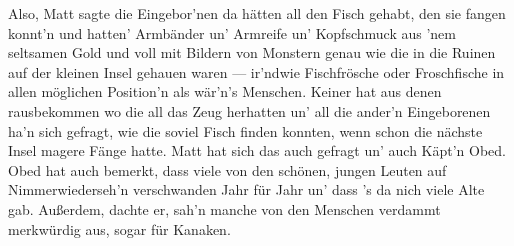 Also, Matt sagte die Eingebor'nen da hätten all den Fisch gehabt, den sie fangen konnt'n und hatten' Armbänder un' Armreife un' Kopfschmuck aus 'nem seltsamen Gold und voll mit Bildern von Monstern genau wie die in die Ruinen auf der kleinen Insel gehauen waren --- ir'ndwie Fischfrösche oder Froschfische in allen möglichen Position'n als wär'n's Menschen. Keiner hat aus denen rausbekommen wo die all das Zeug herhatten un' all die ander'n Eingeborenen ha'n sich gefragt, wie die soviel Fisch finden konnten, wenn schon die nächste Insel magere Fänge hatte. Matt hat sich das auch gefragt un' auch Käpt'n Obed. Obed hat auch bemerkt, dass viele von den schönen, jungen Leuten auf Nimmerwiederseh'n verschwanden Jahr für Jahr un' dass 's da nich viele Alte gab. Außerdem, dachte er, sah'n manche von den Menschen verdammt merkwürdig aus, sogar für Kanaken.
\grqq
